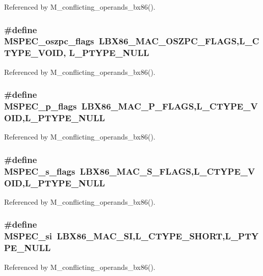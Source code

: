 Referenced by M\_\-conflicting\_\-operands\_\-bx86().
\subsubsection{\setlength{\rightskip}{0pt plus 5cm}\#define MSPEC\_\-oszpc\_\-flags~LBX86\_\-MAC\_\-OSZPC\_\-FLAGS,L\_\-CTYPE\_\-VOID, L\_\-PTYPE\_\-NULL}\label{ml__bx86_8c_b9a67dda5358efb3e5870c4ef32c979f}




Referenced by M\_\-conflicting\_\-operands\_\-bx86().
\subsubsection{\setlength{\rightskip}{0pt plus 5cm}\#define MSPEC\_\-p\_\-flags~LBX86\_\-MAC\_\-P\_\-FLAGS,L\_\-CTYPE\_\-VOID,L\_\-PTYPE\_\-NULL}\label{ml__bx86_8c_8b17f450d3b2622d4564a56afe02de07}




Referenced by M\_\-conflicting\_\-operands\_\-bx86().
\subsubsection{\setlength{\rightskip}{0pt plus 5cm}\#define MSPEC\_\-s\_\-flags~LBX86\_\-MAC\_\-S\_\-FLAGS,L\_\-CTYPE\_\-VOID,L\_\-PTYPE\_\-NULL}\label{ml__bx86_8c_b9f4e0eca472557b8d71d24ee2e2998c}




Referenced by M\_\-conflicting\_\-operands\_\-bx86().
\subsubsection{\setlength{\rightskip}{0pt plus 5cm}\#define MSPEC\_\-si~LBX86\_\-MAC\_\-SI,L\_\-CTYPE\_\-SHORT,L\_\-PTYPE\_\-NULL}\label{ml__bx86_8c_496434fba97bd81337b621e364313b87}




Referenced by M\_\-conflicting\_\-operands\_\-bx86().
